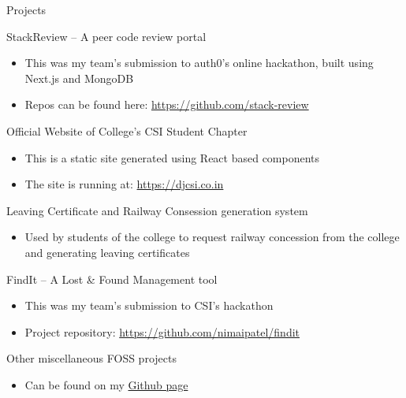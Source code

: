 \documentclass{article}
\newlength{\tabin}
\newlength{\secsep}
\newcommand{\lineunder}{\vspace*{-8pt} \\ \hspace*{-6pt} \hrulefill \\ \vspace*{-15pt}}
\newenvironment{tabbedsection}[1]{
	\begin{list}{}{
		\setlength{\itemsep}{0pt}
		\setlength{\labelsep}{0pt}
		\setlength{\labelwidth}{0pt}
		\setlength{\leftmargin}{\tabin}
		\setlength{\rightmargin}{\tabin}
		\setlength{\listparindent}{0pt}
		\setlength{\parsep}{0pt}
		\setlength{\parskip}{0pt}
		\setlength{\partopsep}{0pt}
		\setlength{\topsep}{#1}
	}
	\item[]
}{\end{list}}
\newenvironment{resume_section}[1]{
	\filbreak
	\vspace{2\secsep}
	\textsc{\large#1}
	\lineunder
	\begin{tabbedsection}{\secsep}
}{\end{tabbedsection}}
\newenvironment{resume_subsection}[2][]{
	\textbf{#2} \hfill {\footnotesize #1} \hspace{2em}
	\begin{tabbedsection}{0.5\secsep}
}{\end{tabbedsection}}
\newenvironment{subitems}{
	\renewcommand{\labelitemi}{-}
	\begin{itemize}
		\setlength{\labelsep}{1em}
}{\end{itemize}}
\begin{document}
\begin{resume_section}{Projects}

	\begin{resume_subsection}{StackReview -- A peer code review portal}
		\begin{subitems}
			\item This was my team's submission to auth0's online hackathon, built using Next.js and MongoDB
			\item Repos can be found here: \href{https://github.com/stack-review}{https://github.com/stack-review}
		\end{subitems}
	\end{resume_subsection}

	\begin{resume_subsection}{Official Website of College's CSI Student Chapter}
		\begin{subitems}
			\item This is a static site generated using React based components
			\item The site is running at: \href{https://djcsi.co.in}{https://djcsi.co.in}
		\end{subitems}
	\end{resume_subsection}

	\begin{resume_subsection}{Leaving Certificate and Railway Consession generation system}
		\begin{subitems}
			\item Used by students of the college to request
				railway concession from the college and
				generating leaving certificates
		\end{subitems}
	\end{resume_subsection}

	\begin{resume_subsection}{FindIt -- A Lost {\&} Found Management tool}
		\begin{subitems}
			\item This was my team's submission to CSI's hackathon
			\item Project repository: \href{https://github.com/nimaipatel/findit}{https://github.com/nimaipatel/findit}
		\end{subitems}
	\end{resume_subsection}

	\begin{resume_subsection}{Other miscellaneous FOSS projects}
		\begin{subitems}
			\item Can be found on my \href{https://github.com/nimaipatel}{Github page}
		\end{subitems}
	\end{resume_subsection}

\end{resume_section}
\end{document}
